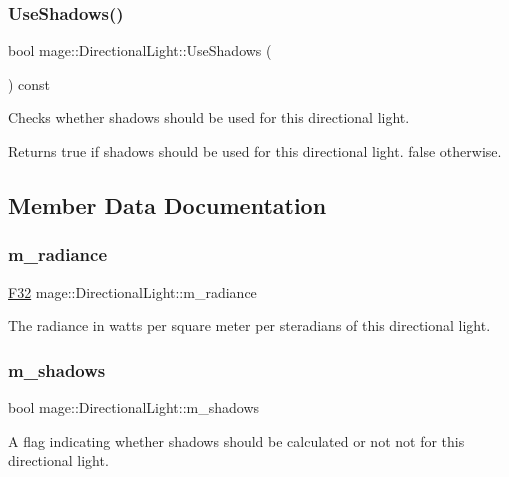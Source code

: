 \subsubsection{\texorpdfstring{Use\+Shadows()}{UseShadows()}}
{\footnotesize\ttfamily bool mage\+::\+Directional\+Light\+::\+Use\+Shadows (\begin{DoxyParamCaption}{ }\end{DoxyParamCaption}) const\hspace{0.3cm}{\ttfamily [noexcept]}}

Checks whether shadows should be used for this directional light.

\begin{DoxyReturn}{Returns}
{\ttfamily true} if shadows should be used for this directional light. {\ttfamily false} otherwise. 
\end{DoxyReturn}


\subsection{Member Data Documentation}
\hypertarget{classmage_1_1_directional_light_aedba48c9e2590284f804ba7cc6225ec3}{}\label{classmage_1_1_directional_light_aedba48c9e2590284f804ba7cc6225ec3} 
\subsubsection{\texorpdfstring{m\+\_\+radiance}{m\_radiance}}
{\footnotesize\ttfamily \hyperlink{namespacemage_aa97e833b45f06d60a0a9c4fc22ae02c0}{F32} mage\+::\+Directional\+Light\+::m\+\_\+radiance\hspace{0.3cm}{\ttfamily [private]}}

The radiance in watts per square meter per steradians of this directional light. \hypertarget{classmage_1_1_directional_light_a607a3dc01ee180f2044fe154c2b73903}{}\label{classmage_1_1_directional_light_a607a3dc01ee180f2044fe154c2b73903} 
\subsubsection{\texorpdfstring{m\+\_\+shadows}{m\_shadows}}
{\footnotesize\ttfamily bool mage\+::\+Directional\+Light\+::m\+\_\+shadows\hspace{0.3cm}{\ttfamily [private]}}

A flag indicating whether shadows should be calculated or not not for this directional light. 